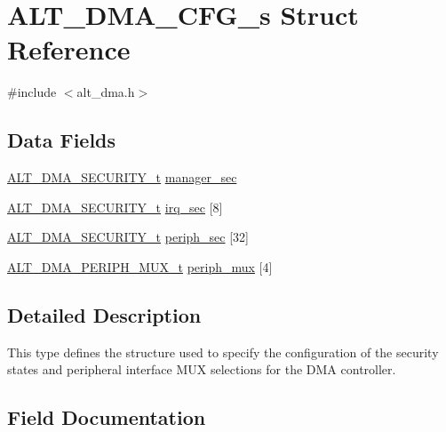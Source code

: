 \hypertarget{structALT__DMA__CFG__s}{}\section{A\+L\+T\+\_\+\+D\+M\+A\+\_\+\+C\+F\+G\+\_\+s Struct Reference}
\label{structALT__DMA__CFG__s}


{\ttfamily \#include $<$alt\+\_\+dma.\+h$>$}

\subsection*{Data Fields}
\begin{DoxyCompactItemize}
\item 
\mbox{\hyperlink{group__ALT__DMA__COMMON_ga59d720d9a72123eca037cc48a734fd7c}{A\+L\+T\+\_\+\+D\+M\+A\+\_\+\+S\+E\+C\+U\+R\+I\+T\+Y\+\_\+t}} \mbox{\hyperlink{structALT__DMA__CFG__s_a8beb2d261a68ceb5c40d7f625245d413}{manager\+\_\+sec}}
\item 
\mbox{\hyperlink{group__ALT__DMA__COMMON_ga59d720d9a72123eca037cc48a734fd7c}{A\+L\+T\+\_\+\+D\+M\+A\+\_\+\+S\+E\+C\+U\+R\+I\+T\+Y\+\_\+t}} \mbox{\hyperlink{structALT__DMA__CFG__s_a851e738f09173bb6cfec6c6896ead152}{irq\+\_\+sec}} \mbox{[}8\mbox{]}
\item 
\mbox{\hyperlink{group__ALT__DMA__COMMON_ga59d720d9a72123eca037cc48a734fd7c}{A\+L\+T\+\_\+\+D\+M\+A\+\_\+\+S\+E\+C\+U\+R\+I\+T\+Y\+\_\+t}} \mbox{\hyperlink{structALT__DMA__CFG__s_a1968f1fbbf77ba088dc4ef9655878df4}{periph\+\_\+sec}} \mbox{[}32\mbox{]}
\item 
\mbox{\hyperlink{group__ALT__DMA__CSR_ga58c7617e50eb450a5435798a109a266d}{A\+L\+T\+\_\+\+D\+M\+A\+\_\+\+P\+E\+R\+I\+P\+H\+\_\+\+M\+U\+X\+\_\+t}} \mbox{\hyperlink{structALT__DMA__CFG__s_a505d1d038be5147bbca6542e68e64d29}{periph\+\_\+mux}} \mbox{[}4\mbox{]}
\end{DoxyCompactItemize}


\subsection{Detailed Description}
This type defines the structure used to specify the configuration of the security states and peripheral interface M\+UX selections for the D\+MA controller. 

\subsection{Field Documentation}
\mbox{\label{structALT__DMA__CFG__s_a851e738f09173bb6cfec6c6896ead152}} 
